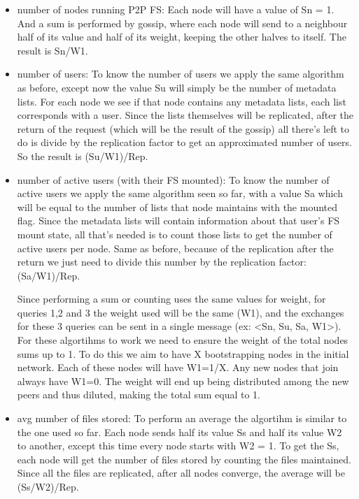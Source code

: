 \documentclass[times,9pt,article]{llncs}
\begin{document}
\begin{itemize}
\item number of nodes running P2P FS:
Each node will have a value of Sn = 1. And a sum is performed by gossip, where each 
node will send to a neighbour half of its value and half of its weight, keeping the 
other halves to itself. The result is Sn/W1.

\item number of users:
To know the number of users we apply the same algorithm as before, except now 
the value Su will simply be the number of metadata lists. For each node we see if
that node contains any metadata lists, each list corresponds with a user. Since 
the lists themselves will be replicated, after the return of the request (which will
be the result of the gossip) all there's left to do is divide by the replication 
factor to get an approximated number of users. So the result is (Su/W1)/Rep.

\item number of active users (with their FS mounted):
To know the number of active users we apply the same algorithm seen so far, with a
value Sa which will be equal to the number of lists that node maintains with the
mounted flag. Since the metadata lists will contain information about that user's
FS mount state, all that's needed is to count those lists to get the number of
active users per node. Same as before, because of the replication after the return
we just need to divide this number by the replication factor: (Sa/W1)/Rep.

Since performing a sum or counting uses the same values for weight, for queries 1,2 
and 3 the weight used will be the same (W1), and the exchanges for these 3 queries 
can be sent in a single message (ex: \textless Sn, Su, Sa, W1\textgreater). For these algortihms to work 
we need to ensure the weight of the total nodes sums up to 1. To do this we aim to
have X bootstrapping nodes in the initial network. Each of these nodes will have 
W1=1/X. 
Any new nodes that join always have W1=0. The weight will end up being distributed 
among the new peers and thus diluted, making the total sum equal to 1.

\item avg number of files stored:
To perform an average the algortihm is similar to the one used so far. Each node
sends half its value Ss and half its value W2 to another, except this time every 
node starts with W2 = 1. To get the Ss, each node will get the number of files 
stored by counting the files maintained. Since all the files are replicated, after
all nodes converge, the average will be (Ss/W2)/Rep.


\end{itemize}
\end{document}

